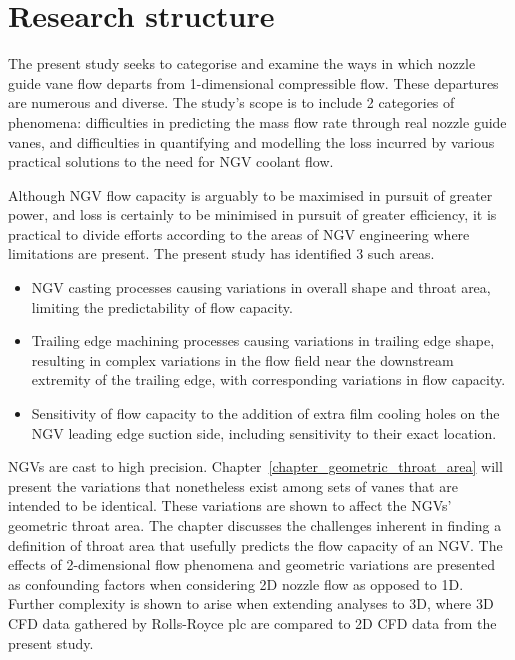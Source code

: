 \documentclass[a4paper, 11pt, oneside]{report}
\begin{document}
\section{Research structure}
\label{research_structure}

The present study seeks to categorise and examine the ways in which nozzle guide vane flow departs from 1-dimensional compressible flow. These departures are numerous and diverse. The study's scope is to include 2 categories of phenomena: difficulties in predicting the mass flow rate through real nozzle guide vanes, and difficulties in quantifying and modelling the loss incurred by various practical solutions to the need for NGV coolant flow.

Although NGV flow capacity is arguably to be maximised in pursuit of greater power, and loss is certainly to be minimised in pursuit of greater efficiency, it is practical to divide efforts according to the areas of NGV engineering where limitations are present. The present study has identified 3 such areas.
\begin{itemize}
	\item NGV casting processes causing variations in overall shape and throat area, limiting the predictability of flow capacity.
	\item Trailing edge machining processes causing variations in trailing edge shape, resulting in complex variations in the flow field near the downstream extremity of the trailing edge, with corresponding variations in flow capacity.
	\item Sensitivity of flow capacity to the addition of extra film cooling holes on the NGV leading edge suction side, including sensitivity to their exact location.
\end{itemize}

NGVs are cast to high precision. Chapter~\ref{chapter_geometric_throat_area} will present the variations that nonetheless exist among sets of vanes that are intended to be identical. These variations are shown to affect the NGVs' geometric throat area. The chapter discusses the challenges inherent in finding a definition of throat area that usefully predicts the flow capacity of an NGV. The effects of 2-dimensional flow phenomena and geometric variations are presented as confounding factors when considering 2D nozzle flow as opposed to 1D. Further complexity is shown to arise when extending analyses to 3D, where 3D CFD data gathered by Rolls-Royce plc are compared to 2D CFD data from the present study.
\end{document}
